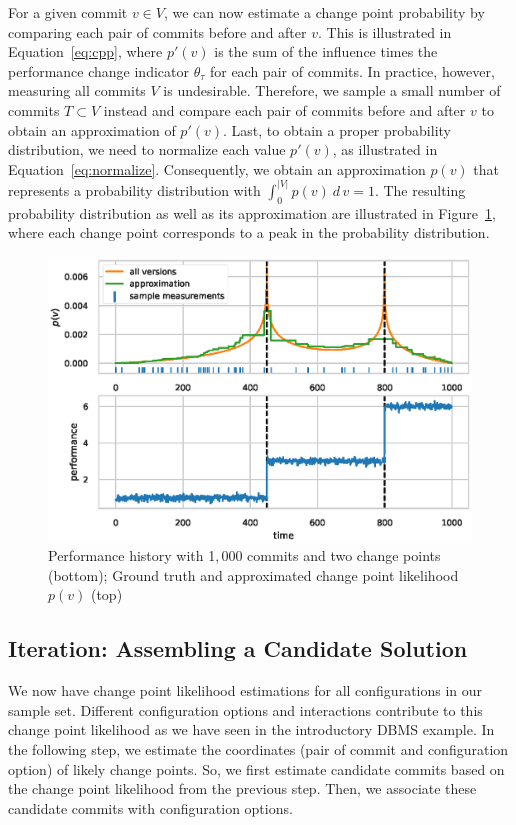 \documentclass[sigconf]{acmart}
\begin{document}
	For a given commit $v\in V$, we can now estimate a change point probability by comparing each pair of commits before and after $v$.
	This is illustrated in Equation~\ref{eq:cpp}, where $p'(v)$ is the sum of the influence times the performance change indicator $\theta_\tau$ for each pair of commits.
	In practice, however, measuring all commits $V$ is undesirable.
	Therefore, we sample a small number of commits $T \subset V$ instead and compare each pair of commits before and after $v$ to obtain an approximation of $p'(v)$.
	Last, to obtain a proper probability distribution, we need to normalize each value $p'(v)$, as illustrated in Equation~\ref{eq:normalize}.
	Consequently, we obtain an approximation $p(v)$ that represents a probability distribution with $\int_0^{\vert V\vert} p(v)\ d\,v = 1$. The resulting probability distribution as well as its approximation are illustrated in Figure~\ref{fig:cpp_example}, where each change point corresponds to a peak in the probability distribution.
	
	\begin{figure}
		\centering
		\includegraphics[width=\linewidth]{images/cpp_example.eps}
		\caption{Performance history with 1,\,000 commits and two change points (bottom); Ground truth and approximated change point likelihood $p(v)$ (top)}
		\label{fig:cpp_example}
	\end{figure}
	
	\subsection{Iteration: Assembling a Candidate Solution}\label{sec:candidatesolution}
	We now have change point likelihood estimations for all configurations in our sample set. 
	Different configuration options and interactions contribute to this change point likelihood as we have seen in the introductory DBMS example. 
	In the following step, we estimate the coordinates (pair of commit and configuration option) of likely change points. 
	So, we first estimate candidate commits based on the change point likelihood from the previous step. 
	Then, we associate these candidate commits with configuration options.
	
\end{document}
